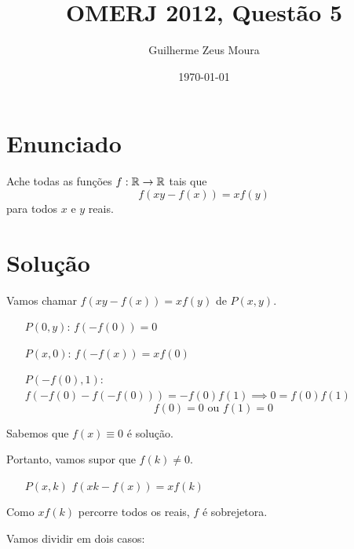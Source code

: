 \documentclass[10pt,a4paper]{article}
\title{OMERJ 2012, Questão 5}
\date{\today}
\author{Guilherme Zeus Moura}
\begin{document}
	\maketitle

	\section{Enunciado}

	Ache todas as funções $f: \mathbb{R} \to \mathbb{R}$ tais que
	$$f(xy - f(x)) = xf(y)$$
	para todos $x$ e $y$ reais.

	\section{Solução}

	Vamos chamar $f(xy - f(x)) = xf(y)$ de $P(x, y)$.

	\begin{enumerate}
		\item[$P(0, y)$:] $f(-f(0)) = 0$
		\item[$P(x,0)$:] $f(-f(x)) = x f(0)$
		\item[$P(-f(0), 1)$:] $f(-f(0)-f(-f(0))) = -f(0)f(1) \implies 0 = f(0)f(1)$\
			$$f(0) = 0 \text{ ou } f(1) = 0$$ 
	\end{enumerate}	

	Sabemos que $f(x) \equiv 0$ é solução. 

	Portanto, vamos supor que $f(k) \neq 0$.

	 \begin{enumerate}
		 \item[$P(x, k)$] $f(xk - f(x)) = xf(k)$
	\end{enumerate}

	Como $xf(k)$ percorre todos os reais, $f$ é sobrejetora.

	Vamos dividir em dois casos:
\end{document}
